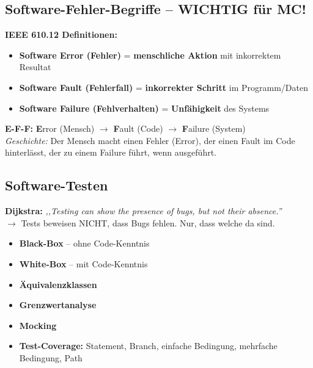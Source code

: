 \documentclass[11pt,a4paper]{article}
\begin{document}
\subsection{Software-Fehler-Begriffe -- WICHTIG für MC!}

\begin{keyfacts}
\textbf{IEEE 610.12 Definitionen:}
\begin{itemize}
  \item \textbf{Software Error (Fehler)} = \textbf{menschliche Aktion} mit inkorrektem Resultat
  \item \textbf{Software Fault (Fehlerfall)} = \textbf{inkorrekter Schritt} im Programm/Daten
  \item \textbf{Software Failure (Fehlverhalten)} = \textbf{Unfähigkeit} des Systems
\end{itemize}
\end{keyfacts}

\begin{merkhilfe}
\textbf{E-F-F:} \textbf{E}rror (Mensch) $\rightarrow$ \textbf{F}ault (Code) $\rightarrow$ \textbf{F}ailure (System)\\
\emph{Geschichte:} Der Mensch macht einen Fehler (Error), der einen Fault im Code hinterlässt, der zu einem Failure führt, wenn ausgeführt.
\end{merkhilfe}

\subsection{Software-Testen}

\begin{story}
\textbf{Dijkstra:} \emph{,,Testing can show the presence of bugs, but not their absence.''}\\
$\rightarrow$ Tests beweisen NICHT, dass Bugs fehlen. Nur, dass welche da sind.
\end{story}

\begin{keyfacts}
\begin{itemize}
  \item \textbf{Black-Box} -- ohne Code-Kenntnis
  \item \textbf{White-Box} -- mit Code-Kenntnis
  \item \textbf{Äquivalenzklassen}
  \item \textbf{Grenzwertanalyse}
  \item \textbf{Mocking}
  \item \textbf{Test-Coverage:} Statement, Branch, einfache Bedingung, mehrfache Bedingung, Path
\end{itemize}
\end{keyfacts}
\end{document}
